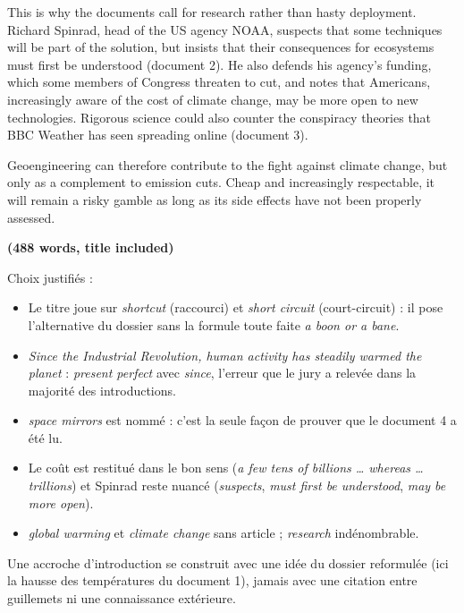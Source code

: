 \documentclass[11pt,a4paper]{article}
\providecommand{\tightlist}{\setlength{\itemsep}{0pt}\setlength{\parskip}{0pt}}
\begin{document}
This is why the documents call for research rather than hasty deployment. Richard Spinrad, head of the US agency NOAA, suspects that some techniques will be part of the solution, but insists that their consequences for ecosystems must first be understood (document 2). He also defends his agency's funding, which some members of Congress threaten to cut, and notes that Americans, increasingly aware of the cost of climate change, may be more open to new technologies. Rigorous science could also counter the conspiracy theories that BBC Weather has seen spreading online (document 3).

Geoengineering can therefore contribute to the fight against climate change, but only as a complement to emission cuts. Cheap and increasingly respectable, it will remain a risky gamble as long as its side effects have not been properly assessed.

\textbf{(488 words, title included)}

Choix justifiés :

\begin{itemize}
\tightlist
\item
  Le titre joue sur \emph{shortcut} (raccourci) et \emph{short circuit} (court-circuit) : il pose l'alternative du dossier sans la formule toute faite \emph{a boon or a bane}.
\item
  \emph{Since the Industrial Revolution, human activity has steadily warmed the planet} : \emph{present perfect} avec \emph{since}, l'erreur que le jury a relevée dans la majorité des introductions.
\item
  \emph{space mirrors} est nommé : c'est la seule façon de prouver que le document 4 a été lu.
\item
  Le coût est restitué dans le bon sens (\emph{a few tens of billions \ldots{} whereas \ldots{} trillions}) et Spinrad reste nuancé (\emph{suspects}, \emph{must first be understood}, \emph{may be more open}).
\item
  \emph{global warming} et \emph{climate change} sans article ; \emph{research} indénombrable.
\end{itemize}

\begin{methode}

Une accroche d'introduction se construit avec une idée du dossier reformulée (ici la hausse des températures du document 1), jamais avec une citation entre guillemets ni une connaissance extérieure.

\end{methode}
\end{document}
